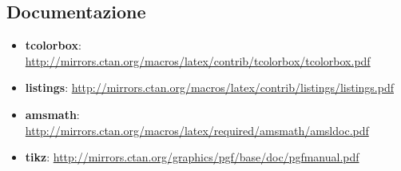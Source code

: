 \documentclass{csnotes}
\begin{document}
\subsection{Documentazione}

\begin{itemize}
    \item \textbf{tcolorbox}: \url{http://mirrors.ctan.org/macros/latex/contrib/tcolorbox/tcolorbox.pdf}
    \item \textbf{listings}: \url{http://mirrors.ctan.org/macros/latex/contrib/listings/listings.pdf}
    \item \textbf{amsmath}: \url{http://mirrors.ctan.org/macros/latex/required/amsmath/amsldoc.pdf}
    \item \textbf{tikz}: \url{http://mirrors.ctan.org/graphics/pgf/base/doc/pgfmanual.pdf}
\end{itemize}

\end{document}
